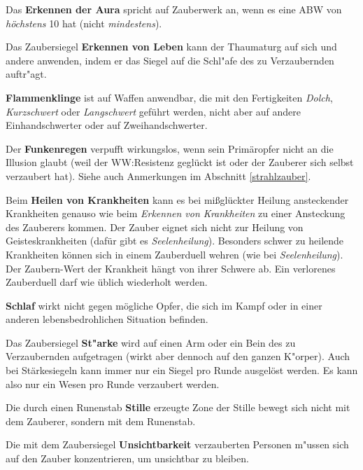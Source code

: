 \documentclass[10pt,a4paper,germanpar]{article}
\begin{document}
Das \textbf{Erkennen der Aura} spricht auf Zauberwerk an, wenn es eine ABW von
\emph{höchstens} 10 hat (nicht \emph{mindestens}).

Das Zaubersiegel \textbf{Erkennen von Leben} kann der Thaumaturg auf
sich und andere anwenden, indem er das Siegel auf die Schl"afe des zu
Verzaubernden auftr"agt.

\textbf{Flammenklinge} ist auf Waffen anwendbar, die mit den
Fertigkeiten \emph{Dolch}, \emph{Kurzschwert} oder \emph{Langschwert}
geführt werden, nicht aber auf andere Einhandschwerter oder auf
Zweihandschwerter.

Der \textbf{Funkenregen} verpufft wirkungslos, wenn sein Primäropfer
nicht an die Illusion glaubt (weil der WW:Resistenz geglückt ist oder
der Zauberer sich selbst verzaubert hat). Siehe auch Anmerkungen im
Abschnitt \ref{strahlzauber}.

Beim \textbf{Heilen von Krankheiten} kann es bei mißglückter Heilung
ansteckender Krankheiten genauso wie beim \emph{Erkennen von
  Krankheiten} zu einer Ansteckung des Zauberers kommen. Der Zauber
eignet sich nicht zur Heilung von Geisteskrankheiten (dafür gibt es
\emph{Seelenheilung}). Besonders schwer zu heilende Krankheiten können
sich in einem Zauberduell wehren (wie bei \emph{Seelenheilung}). Der
Zaubern-Wert der Krankheit hängt von ihrer Schwere ab. Ein verlorenes
Zauberduell darf wie üblich wiederholt werden.

\textbf{Schlaf} wirkt nicht gegen mögliche Opfer, die sich im Kampf
oder in einer anderen lebensbedrohlichen Situation befinden.

Das Zaubersiegel \textbf{St"arke} wird auf einen Arm oder ein Bein des 
zu Verzaubernden aufgetragen (wirkt aber dennoch auf den ganzen
K"orper). Auch bei Stärkesiegeln kann immer nur ein Siegel pro Runde ausgelöst
werden. Es kann also nur ein Wesen pro Runde verzaubert werden.

Die durch einen Runenstab \textbf{Stille} erzeugte Zone der Stille
bewegt sich nicht mit dem Zauberer, sondern mit dem Runenstab.

%

Die mit dem Zaubersiegel \textbf{Unsichtbarkeit} verzauberten Personen 
m"ussen sich auf den Zauber konzentrieren, um unsichtbar zu bleiben.
\end{document}
